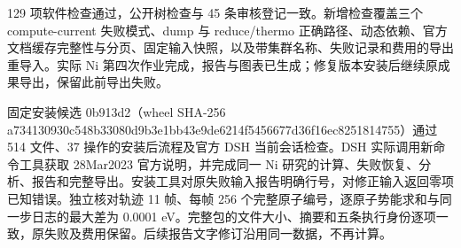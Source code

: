 \documentclass[11pt,a4paper]{ctexart}
\begin{document}
129 项软件检查通过，公开树检查与 45 条审核登记一致。新增检查覆盖三个 compute-current 失败模式、dump 与 reduce/\allowbreak{}thermo 正确路径、动态依赖、官方文档缓存完整性与分页、固定输入快照，以及带集群名称、失败记录和费用的导出重导入。实际 Ni 第四次作业完成，报告与图表已生成；修复版本安装后继续原成果导出，保留此前导出失败。



固定安装候选 0b913d2（wheel SHA-256 a7341309\allowbreak{}30c548b3\allowbreak{}3080d9b3\allowbreak{}e1bb43e9\allowbreak{}de6214f5\allowbreak{}456677d3\allowbreak{}6f16ec82\allowbreak{}51814755）通过 514 文件、37 操作的安装后流程及官方 DSH 当前会话检查。DSH 实际调用新命令工具获取 28Mar2023 官方说明，并完成同一 Ni 研究的计算、失败恢复、分析、报告和完整导出。安装工具对原失败输入报告明确行号，对修正输入返回零项已知错误。独立核对轨迹 11 帧、每帧 256 个完整原子编号，逐原子势能求和与同一步日志的最大差为 0.0001 eV。完整包的文件大小、摘要和五条执行身份逐项一致，原失败及费用保留。后续报告文字修订沿用同一数据，不再计算。
\end{document}
